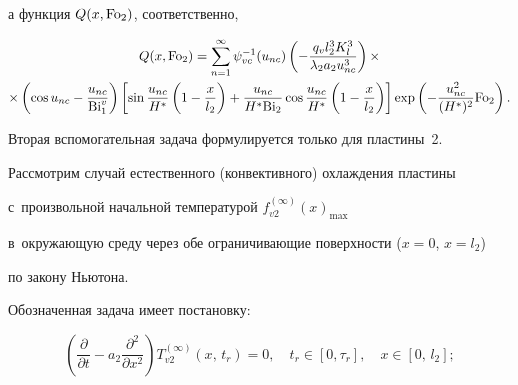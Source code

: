 а функция $Q(x, {\rm Fo}_2)$, соответственно, 

\begin{multline*}

 Q(x, {\rm Fo}_2) = 

\sum\limits_{n = 1}^\infty \psi _{vc}^{-1} (u_{nc}) 

\left( 

- \frac{q_v l_2^3K_l^3}{\lambda_2 a_2 u_{nc}^3}

\right) 

\times

\\

\times

\left(

\cos u_{nc} -\frac{u_{nc}}{{ \rm Bi}_1^v}

\right)

\left[

\sin \frac{u_{nc}}{H^*}\left(1-\frac x{l_2}\right) + \frac{u_{nc}}{H^*{\rm Bi}_2}

\cos \frac{u_{nc}}{H^*}\left(1-\frac x{l_2}\right)

\right]\exp \left( - \frac{u_{nc}^2 }{(H^\ast )^2}{\rm Fo}_2  \right).

\end{multline*}





Вторая вспомогательная задача формулируется только для пластины~2. 

Рассмотрим случай естественного (конвективного) охлаждения пластины 

с~произвольной начальной температурой $f_{v2}^{(\infty )} (x)_{\max } $ 

в~окружающую среду через обе ограничивающие поверхности ($x = 0$, $x = l_2$) 

по закону Ньютона. 



Обозначенная задача имеет постановку:

\begin{equation}

\label{evdok:eq36}

\left( {\frac{\partial }{\partial t} - a_2 \frac{\partial ^2}{\partial x^2}} 

\right)T_{v2}^{(\infty )} (x,\,t_r ) = 0,\quad t_r \in [0,\tau _r ],\quad x \in [0,\,l_2 ];

\end{equation}



